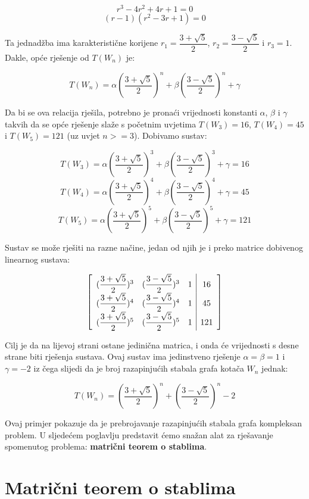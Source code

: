 \documentclass[times, utf8, zavrsni]{fer}
\begin{document}
\[r^3 - 4r^2 + 4r + 1 = 0\]
\[(r - 1)(r^2 - 3r + 1) = 0\]

Ta jednadžba ima karakteristične korijene $r_1 = \dfrac{3 + \sqrt{5}}{2}$, $r_2 = \dfrac{3 - \sqrt{5}}{2}$ i $r_3 = 1$. Dakle, opće rješenje od $T(W_n)$ je:

\[T(W_n) = \alpha(\dfrac{3 + \sqrt{5}}{2})^n + \beta(\dfrac{3 - \sqrt{5}}{2})^n + \gamma\]

Da bi se ova relacija rješila, potrebno je pronaći vrijednosti konstanti $\alpha$, $\beta$ i $\gamma$ takvih da se opće rješenje slaže s početnim uvjetima $T(W_3) = 16$, $T(W_4) = 45$ i $T(W_5) = 121$ (uz uvjet $n >= 3$). Dobivamo sustav:

\[T(W_3) = \alpha(\dfrac{3 + \sqrt{5}}{2})^3 + \beta(\dfrac{3 - \sqrt{5}}{2})^3 + \gamma = 16\]
\[T(W_4) = \alpha(\dfrac{3 + \sqrt{5}}{2})^4 + \beta(\dfrac{3 - \sqrt{5}}{2})^4 + \gamma = 45\]
\[T(W_5) = \alpha(\dfrac{3 + \sqrt{5}}{2})^5 + \beta(\dfrac{3 - \sqrt{5}}{2})^5 + \gamma = 121\]

Sustav se može rješiti na razne načine, jedan od njih je i preko matrice dobivenog linearnog sustava:

\[
\centering 
\begin{bmatrix}
	\begin{array}{ccc|c}
		(\dfrac{3 + \sqrt{5}}{2})^3 & (\dfrac{3 - \sqrt{5}}{2})^3 & 1 & 16 \\
		(\dfrac{3 + \sqrt{5}}{2})^4 & (\dfrac{3 - \sqrt{5}}{2})^4 & 1 & 45 \\
		(\dfrac{3 + \sqrt{5}}{2})^5 & (\dfrac{3 - \sqrt{5}}{2})^5 & 1 & 121 \\
	\end{array}
\end{bmatrix}
\]

Cilj je da na lijevoj strani ostane jedinična matrica, i onda će vrijednosti s desne strane biti rješenja sustava. Ovaj sustav ima jedinstveno rješenje $\alpha = \beta = 1$ i $\gamma = -2$ iz čega slijedi da je broj razapinjućih stabala grafa kotača $W_n$ jednak:

\begin{equation}
T(W_n) = (\dfrac{3 + \sqrt{5}}{2})^n + (\dfrac{3 - \sqrt{5}}{2})^n - 2
\end{equation}

Ovaj primjer pokazuje da je prebrojavanje razapinjućih stabala grafa kompleksan problem. U sljedećem poglavlju predstavit ćemo snažan alat za rješavanje spomenutog problema: \textbf{matrični teorem o stablima}.

\chapter{Matrični teorem o stablima}
\end{document}
